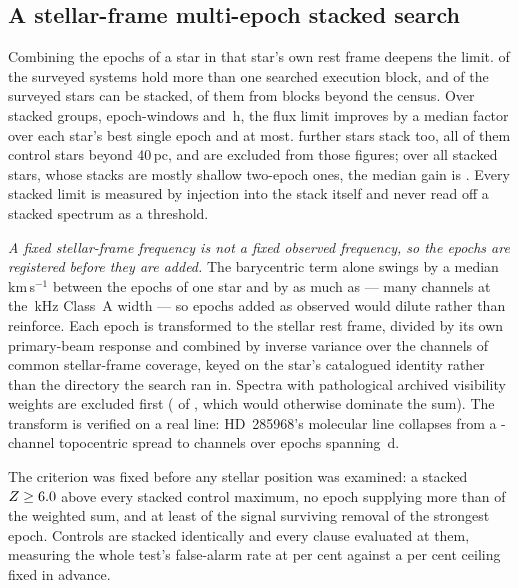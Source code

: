 \subsection{A stellar-frame multi-epoch stacked search}
\label{sec:stack}

Combining the epochs of a star in that star's own rest frame deepens the
limit. \EpMulti{} of the \NSystems{} surveyed systems hold more than one
searched execution block, and \SxStkStarCensus{} of the surveyed stars can be
stacked, \SttNStkOneEb{} of them from blocks beyond the census. Over
\SyStkNGroup{} stacked groups, \SyStkNEpochComb{} epoch-windows and
\SyStkHours\,h, the flux limit improves by a median factor \SyStkGainMed{}
over each star's best single epoch and \SyStkGainMax{} at most.
\SxStkStarOutside{} further stars stack too, all of them control stars beyond
40\,pc, and are excluded from those figures; over all \StkNStar{} stacked
stars, whose stacks are mostly shallow two-epoch ones, the median gain is
\StkLimitGainMed. Every
stacked limit is measured by injection into the stack itself and never read
off a stacked spectrum as a threshold.

\emph{A fixed stellar-frame frequency is not a fixed observed frequency, so
the epochs are registered before they are added.} The barycentric term alone
swings by a median \StkVcorrSwingMed\,km\,s$^{-1}$ between the epochs of one
star and by as much as \StkVcorrSwingMax{} --- many channels at the
\StkRefChanKHz\,kHz Class~A width --- so epochs added as observed would dilute
rather than reinforce. Each epoch is transformed to the stellar rest frame,
divided by its own primary-beam response and combined by inverse variance
over the channels of common stellar-frame coverage, keyed on the star's
catalogued identity rather than the directory the search ran in. Spectra with
pathological archived visibility weights are excluded first
(\StkBadWeight{} of \StkNProd, which would otherwise dominate the sum). The transform is verified on a real line: HD~285968's molecular
line collapses from a \StkRegTopoChan-channel topocentric spread to
\StkRegStellarChan{} channels over \StkRegNEpoch{} epochs spanning
\StkRegSpanD\,d.

The criterion was fixed before any stellar position was examined: a stacked
$Z\ge6.0$ above every stacked control maximum, no epoch supplying more
than \StkDomMax{} of the weighted sum, and at least \StkJkMin{} of the signal
surviving removal of the strongest epoch. Controls are stacked identically
and every clause evaluated at them, measuring the whole test's
false-alarm rate at \StkCtrlFap{} per cent against a \StkFapCeil{} per cent
ceiling fixed in advance.

